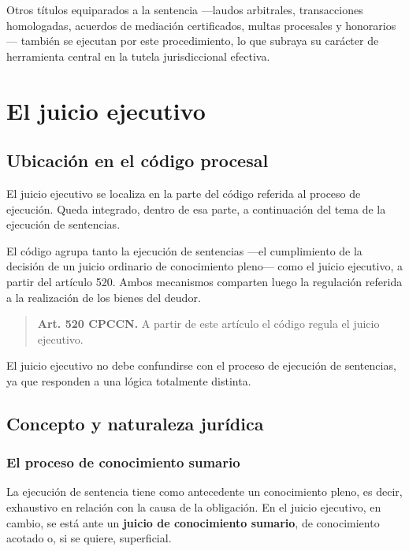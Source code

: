 \documentclass[12pt,oneside]{book}
\begin{document}
Otros títulos equiparados a la sentencia ---laudos arbitrales, transacciones homologadas, acuerdos de mediación certificados, multas procesales y honorarios--- también se ejecutan por este procedimiento, lo que subraya su carácter de herramienta central en la tutela jurisdiccional efectiva.

\chapter{El juicio ejecutivo}\label{cap:juicioejecutivo}


\section{Ubicación en el código procesal}

El juicio ejecutivo se localiza en la parte del código referida al proceso de ejecución. Queda integrado, dentro de esa parte, a continuación del tema de la ejecución de sentencias.

El código agrupa tanto la ejecución de sentencias ---el cumplimiento de la decisión de un juicio ordinario de conocimiento pleno--- como el juicio ejecutivo, a partir del artículo 520. Ambos mecanismos comparten luego la regulación referida a la realización de los bienes del deudor.

\begin{quote}
\textbf{Art. 520 CPCCN.} A partir de este artículo el código regula el juicio ejecutivo.
\end{quote}

\begin{important}
El juicio ejecutivo no debe confundirse con el proceso de ejecución de sentencias, ya que responden a una lógica totalmente distinta.
\end{important}

\section{Concepto y naturaleza jurídica}

\subsection{El proceso de conocimiento sumario}

La ejecución de sentencia tiene como antecedente un conocimiento pleno, es decir, exhaustivo en relación con la causa de la obligación. En el juicio ejecutivo, en cambio, se está ante un \textbf{juicio de conocimiento sumario}, de conocimiento acotado o, si se quiere, superficial.
\end{document}
